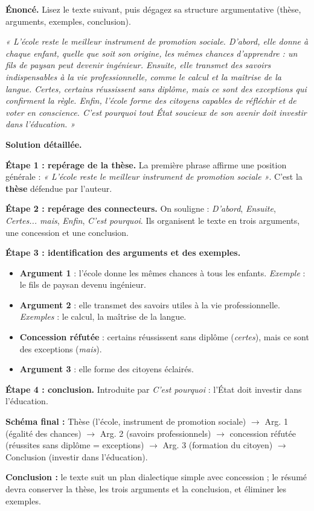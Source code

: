 \documentclass[11pt]{article}
\begin{document}
\begin{exoresolu}
\textbf{Énoncé.} Lisez le texte suivant, puis dégagez sa structure argumentative (thèse, arguments, exemples, conclusion).

\emph{« L'école reste le meilleur instrument de promotion sociale. D'abord, elle donne à chaque enfant, quelle que soit son origine, les mêmes chances d'apprendre : un fils de paysan peut devenir ingénieur. Ensuite, elle transmet des savoirs indispensables à la vie professionnelle, comme le calcul et la maîtrise de la langue. Certes, certains réussissent sans diplôme, mais ce sont des exceptions qui confirment la règle. Enfin, l'école forme des citoyens capables de réfléchir et de voter en conscience. C'est pourquoi tout État soucieux de son avenir doit investir dans l'éducation. »}

\tcblower
\textbf{Solution détaillée.}

\textbf{Étape 1 : repérage de la thèse.} La première phrase affirme une position générale : \emph{« L'école reste le meilleur instrument de promotion sociale »}. C'est la \textbf{thèse} défendue par l'auteur.

\textbf{Étape 2 : repérage des connecteurs.} On souligne : \emph{D'abord}, \emph{Ensuite}, \emph{Certes... mais}, \emph{Enfin}, \emph{C'est pourquoi}. Ils organisent le texte en trois arguments, une concession et une conclusion.

\textbf{Étape 3 : identification des arguments et des exemples.}
\begin{itemize}
\item \textbf{Argument 1} : l'école donne les mêmes chances à tous les enfants. \emph{Exemple} : le fils de paysan devenu ingénieur.
\item \textbf{Argument 2} : elle transmet des savoirs utiles à la vie professionnelle. \emph{Exemples} : le calcul, la maîtrise de la langue.
\item \textbf{Concession réfutée} : certains réussissent sans diplôme (\emph{certes}), mais ce sont des exceptions (\emph{mais}).
\item \textbf{Argument 3} : elle forme des citoyens éclairés.
\end{itemize}

\textbf{Étape 4 : conclusion.} Introduite par \emph{C'est pourquoi} : l'État doit investir dans l'éducation.

\textbf{Schéma final :} Thèse (l'école, instrument de promotion sociale) $\rightarrow$ Arg. 1 (égalité des chances) $\rightarrow$ Arg. 2 (savoirs professionnels) $\rightarrow$ concession réfutée (réussites sans diplôme = exceptions) $\rightarrow$ Arg. 3 (formation du citoyen) $\rightarrow$ Conclusion (investir dans l'éducation).

\textbf{Conclusion :} le texte suit un plan dialectique simple avec concession ; le résumé devra conserver la thèse, les trois arguments et la conclusion, et éliminer les exemples.
\end{exoresolu}
\end{document}
